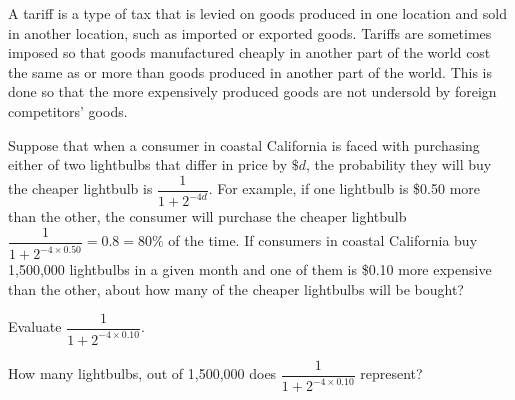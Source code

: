 \documentclass{ximera}
\begin{document}
A tariff is a type of tax that is levied on goods produced in one location and sold in another location, such as imported or exported goods. Tariffs are sometimes imposed so that goods manufactured cheaply in another part of the world cost the same as or more than goods produced in another part of the world. This is done so that the more expensively produced goods are not undersold by foreign competitors' goods.

\begin{question}
Suppose that when a consumer in coastal California is faced with purchasing either of two lightbulbs that differ in price by $\$d$, the probability they will buy the cheaper lightbulb is $\dfrac{1}{1+2^{-4d}}$. For example, if one lightbulb is \$0.50 more than the other, the consumer will purchase the cheaper lightbulb $\dfrac{1}{1+2^{-4\times 0.50}}=0.8=80\%$ of the time.
If consumers in coastal California buy 1,500,000 lightbulbs in a given month and one of them is \$0.10 more expensive than the other, about how many of the cheaper lightbulbs will be bought?

\begin{solution}
 \begin{multiple-choice}
    \end{multiple-choice}
\begin{hint}
Evaluate $\dfrac{1}{1+2^{-4\times 0.10}}$.
\end{hint}
\begin{hint}
How many lightbulbs, out of 1,500,000 does $\dfrac{1}{1+2^{-4\times 0.10}}$ represent?
\end{hint}
\end{solution}
\end{question}
\end{document}
